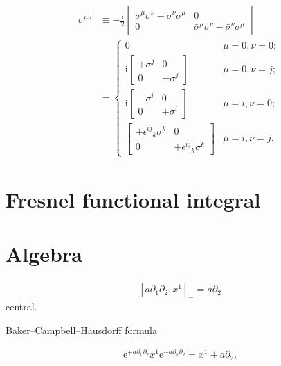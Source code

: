 \documentclass[12pt]{article}
\newcommand\mi{\mathrm{i}} %
\newcommand\me{\mathrm{e}} %
\newcommand{\sbr}[1]{{\left[#1\right]}}
\begin{document}
\begin{align}
\sigma^{\mu\nu} &\equiv -\frac{\mi}{2}
\begin{bmatrix}
\sigma^\mu\bar\sigma^\nu-\sigma^\nu\bar\sigma^\mu & 0 \\
0 & \bar\sigma^\mu\sigma^\nu-\bar\sigma^\nu\sigma^\mu
\end{bmatrix} \nonumber \\
&=
\begin{cases}
0 & \mu = 0, \nu = 0; \\
\mi \begin{bmatrix}+\sigma^j & 0 \\ 0 & -\sigma^j\end{bmatrix}
& \mu = 0, \nu = j; \\
\mi \begin{bmatrix}-\sigma^i & 0 \\ 0 & +\sigma^i\end{bmatrix}
& \mu = i, \nu = 0; \\
\begin{bmatrix}
+\epsilon^{ij}{}_k \sigma^k & 0
\\ 0 & +\epsilon^{ij}{}_k \sigma^k\end{bmatrix}
& \mu = i, \nu = j.
\end{cases}
\end{align}


\section{Fresnel functional integral}

\citep[ch.~10]{mosel2004}

\section{Algebra}
\begin{align}
\sbr{a\partial_1 \partial_2, x^1}_- = a\partial_2
\end{align}
central.

Baker--Campbell--Hausdorff formula

\begin{align}
\me^{+a\partial_1\partial_2} x^1 \me^{-a\partial_1\partial_2}
= x^1 + a \partial_2.
\end{align}



\printbibliography
\end{document}
